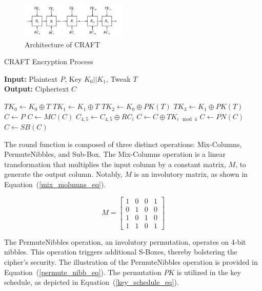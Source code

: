 \documentclass[final,5p,times,twocolumn]{elsarticle}
\begin{document}
\begin{figure}[h]%
    \centering
    \includegraphics[width=0.45\textwidth]{./fig/struct-craft.pdf}
    \caption{Architecture of CRAFT}\label{fig1}
\end{figure}

\begin{algorithm}[h]
    \caption{CRAFT Encryption Process}\label{alg1}
    \textbf{Input:} Plaintext $P$, Key $K_0||K_1$, Tweak $T$ \\
    \textbf{Output:} Ciphertext $C$
    \begin{algorithmic}[1]
        \State $TK_0 \gets K_0\oplus T$
        \State $TK_1 \gets K_1\oplus T$
        \State $TK_2 \gets K_0\oplus PK(T)$
        \State $TK_3 \gets K_1\oplus PK(T)$
        \State $C \gets P$
        \State $C \gets MC(C)$
        \State $C_{4,5} \gets C_{4,5}\oplus RC_i$
        \State $C \gets C \oplus TK_{i\mod 4}$
        \State $C \gets PN(C)$
        \State $C \gets SB(C)$
        \EndIf
        \EndFor
    \end{algorithmic}
\end{algorithm}

The round function is composed of three distinct operations: Mix-Columns, PermuteNibbles, and Sub-Box.
The Mix-Columns operation is a linear transformation that multiplies the input column by a constant matrix, $M$, to generate the output column. Notably, $M$ is an involutory matrix, as shown in Equation~(\ref{mix_molumns_eq}).


\begin{equation}
    M =
    \begin{bmatrix}
        1 & 0 & 0 & 1 \\
        0 & 1 & 0 & 0 \\
        1 & 0 & 1 & 0 \\
        1 & 1 & 0 & 1
    \end{bmatrix}
    \label{mix_molumns_eq}
\end{equation}

The PermuteNibbles operation, an involutory permutation, operates on 4-bit nibbles. This operation triggers additional S-Boxes, thereby bolstering the cipher's security. The illustration of the PermuteNibbles operation is provided in Equation~(\ref{permute_nibb_eq}). The permutation $PK$ is utilized in the key schedule, as depicted in Equation~(\ref{key_schedule_eq}).
\end{document}
